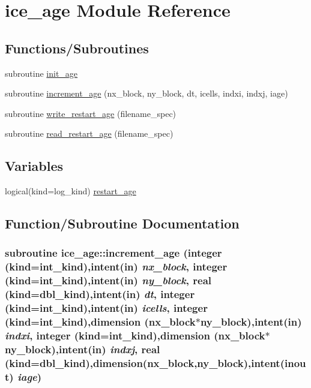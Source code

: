 \hypertarget{namespaceice__age}{
\section{ice\_\-age Module Reference}
\label{namespaceice__age}
}
\subsection*{Functions/Subroutines}
\begin{DoxyCompactItemize}
\item 
subroutine \hyperlink{namespaceice__age_ab41cc265d5ceb720ed00b72b52f9d0e1}{init\_\-age}
\item 
subroutine \hyperlink{namespaceice__age_a13de3091a45531a0efb67a54687c35d2}{increment\_\-age} (nx\_\-block, ny\_\-block, dt, icells, indxi, indxj, iage)
\item 
subroutine \hyperlink{namespaceice__age_a6eb51bd21cc52fcd8d1985badbfca036}{write\_\-restart\_\-age} (filename\_\-spec)
\item 
subroutine \hyperlink{namespaceice__age_ab078eb2b576a145e5de96f2c9daa06c5}{read\_\-restart\_\-age} (filename\_\-spec)
\end{DoxyCompactItemize}
\subsection*{Variables}
\begin{DoxyCompactItemize}
\item 
logical(kind=log\_\-kind) \hyperlink{namespaceice__age_ad634a6462e5a115ebaa8822c16324ee9}{restart\_\-age}
\end{DoxyCompactItemize}


\subsection{Function/Subroutine Documentation}
\hypertarget{namespaceice__age_a13de3091a45531a0efb67a54687c35d2}{
\subsubsection[{increment\_\-age}]{\setlength{\rightskip}{0pt plus 5cm}subroutine ice\_\-age::increment\_\-age (integer (kind=int\_\-kind),intent(in) {\em nx\_\-block}, \/  integer (kind=int\_\-kind),intent(in) {\em ny\_\-block}, \/  real (kind=dbl\_\-kind),intent(in) {\em dt}, \/  integer (kind=int\_\-kind),intent(in) {\em icells}, \/  integer (kind=int\_\-kind),dimension (nx\_\-block$\ast$ny\_\-block),intent(in) {\em indxi}, \/  integer (kind=int\_\-kind),dimension (nx\_\-block$\ast$ny\_\-block),intent(in) {\em indxj}, \/  real (kind=dbl\_\-kind),dimension(nx\_\-block,ny\_\-block),intent(inout) {\em iage})}}
\label{namespaceice__age_a13de3091a45531a0efb67a54687c35d2}



